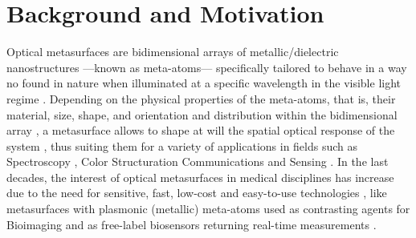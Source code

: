 
\chapter*{Background and Motivation}
\label{chapter:intro}



Optical metasurfaces are bidimensional arrays of metallic/dielectric nanostructures ---known as meta-atoms--- specifically tailored to behave in a way no found in nature when illuminated at a specific wavelength in the visible light regime \cite{khan_optical_2022,gonzalez-alcalde_large_2020}. Depending on the physical properties of the meta-atoms, that is, their material, size, shape, and orientation and distribution within the bidimensional array \cite{kim_plasmonic_2019,khan_optical_2022}, a metasurface  allows to shape at will the  spatial optical response of the system \cite{chen_review_2016}, thus suiting them for a variety of applications in fields such as Spectroscopy \cite{khan_optical_2022}, Color Structuration \cite{gonzalez-alcalde_large_2020} Communications \cite{chen_review_2016} and Sensing \cite{estevez_trends_2014,jain_noble_2008,khan_optical_2022,chen_review_2016,kim_plasmonic_2019}. In the last decades, the interest of optical metasurfaces in medical disciplines has increase due to  the need for sensitive, fast, low-cost and easy-to-use technologies \cite{estevez_trends_2014,kim_plasmonic_2019}, like metasurfaces with plasmonic (metallic) meta-atoms used as contrasting agents for Bioimaging  \cite{kim_plasmonic_2019} and as free-label biosensors returning real-time measurements \cite{estevez_trends_2014,kabashin_plasmonic_2009,khan_optical_2022}.

